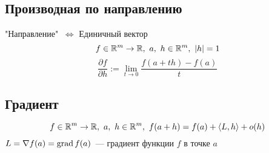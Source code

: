 \documentclass[../main.tex]{subfiles}
\begin{document}
\subsection{Производная по направлению}
"Направление" $\ \Leftrightarrow$ Единичный вектор
$$
    f \in \mathbb{R}^m \rightarrow \mathbb{R}, \ a, \ h \in \mathbb{R}^m, \ \left| h \right| = 1 
$$
$$ 
    \frac{\partial f}{\partial h} := \lim_{t \rightarrow 0}{\frac{f(a + t h) -f (a)}{t}}
$$

\subsection{Градиент}
$$
    f \in \mathbb{R}^m \rightarrow \mathbb{R}, \ a, \ h \in \mathbb{R}^m, \ f(a + h) = f(a) + \langle  L, h  \rangle + o(h)
$$
$L = \nabla f(a) = \operatorname*{grad} f(a)$~--- градиент функции $f$ в точке $a$
\end{document}
